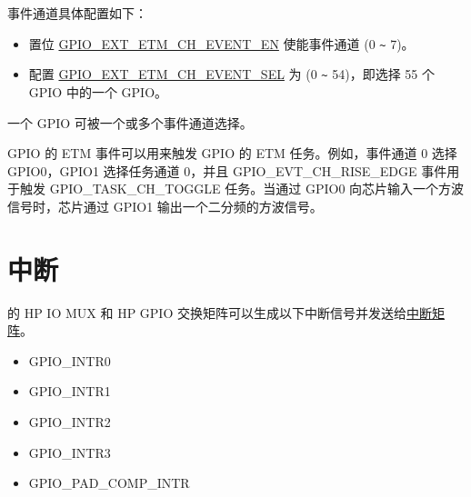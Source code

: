 \documentclass[main\_\_CN.tex]{subfiles}
\begin{document}
事件通道具体配置如下：

\begin{itemize}
    \item 置位 \hyperref[fielddesc:GPIOSDETMCH0EVENTEN]{GPIO\_EXT\_ETM\_CH\_EVENT\_EN} 使能事件通道  (0 \verb+~+ 7)。
    \item 配置 \hyperref[fielddesc:GPIOSDETMCH0EVENTSEL]{GPIO\_EXT\_ETM\_CH\_EVENT\_SEL} 为  (0 \verb+~+ 54)，即选择 55 个 GPIO 中的一个 GPIO。
\end{itemize}

\begin{tiplisting}
 一个 GPIO 可被一个或多个事件通道选择。
\end{tiplisting}

GPIO 的 ETM 事件可以用来触发 GPIO 的 ETM 任务。例如，事件通道 0 选择 GPIO0，GPIO1 选择任务通道 0，并且 GPIO\_EVT\_CH\_RISE\_EDGE 事件用于触发 GPIO\_TASK\_CH\_TOGGLE 任务。当通过 GPIO0 向芯片输入一个方波信号时，芯片通过 GPIO1 输出一个二分频的方波信号。

\section{中断}

\chipname{} 的 HP IO MUX 和 HP GPIO 交换矩阵可以生成以下中断信号并发送给\hyperref[mod:intmtrx]{中断矩阵}。

    \begin{itemize}
        \item GPIO\_INTR0
        \item GPIO\_INTR1
        \item GPIO\_INTR2
        \item GPIO\_INTR3
        \item GPIO\_PAD\_COMP\_INTR
    \end{itemize}
\end{document}
